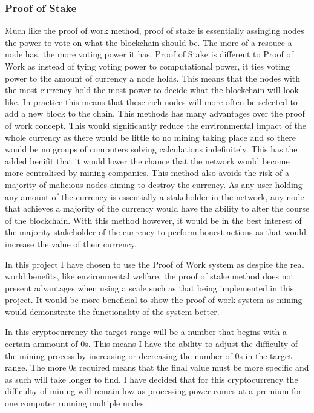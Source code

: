 \documentclass{l4proj}
\begin{document}
\subsubsection{Proof of Stake}
Much like the proof of work method, proof of stake is essentially assinging nodes the power to vote on what the
blockchain should be. The more of a resouce a node has, the more voting power it has. Proof of Stake is different
to Proof of Work as instead of tying voting power to computational power, it ties voting power to the amount
of currency a node holds. This means that the nodes with the most currency hold the most power to decide what the
blockchain will look like. In practice this means that these rich nodes will more often be selected to add a new
block to the chain. This methods has many advantages over the proof of work concept. This would significantly
reduce the environmental impact of the whole currency as there would be little to no mining taking place and so
there would be no groups of computers solving calculations indefinitely. This has the added benifit that
it would lower the chance that the network would become more centralised by mining companies. This method also
avoids the risk of a majority of malicious nodes aiming to destroy the currency. As any user holding any amount
of the currency is essentially a stakeholder in the network, any node that achieves a majority of the currency 
would have the ability to alter the course of the blockchain. With this method however, it would be in the best
interest of the majority stakeholder of the currency to perform honest actions as that would increase the value
of their currency.

In this project I have chosen to use the Proof of Work system as despite the real world benefits, like environmental
welfare, the proof of stake method does not present advantages when using a scale such as that being implemented
in this project. It would be more beneficial to show the proof of work system as mining would demonstrate the
functionality of the system better.

In this cryptocurrency the target range will be a number that begins with a certain
ammount of 0s. This means I have the ability to adjust the difficulty of the mining process by increasing
or decreasing the number of 0s in the target range. The more 0s required means that the final value must be more
specific and as such will take longer to find. I have decided that for this cryptocurrency the difficulty of mining
will remain low as processing power comes at a premium for one computer running multiple nodes.
\end{document}
